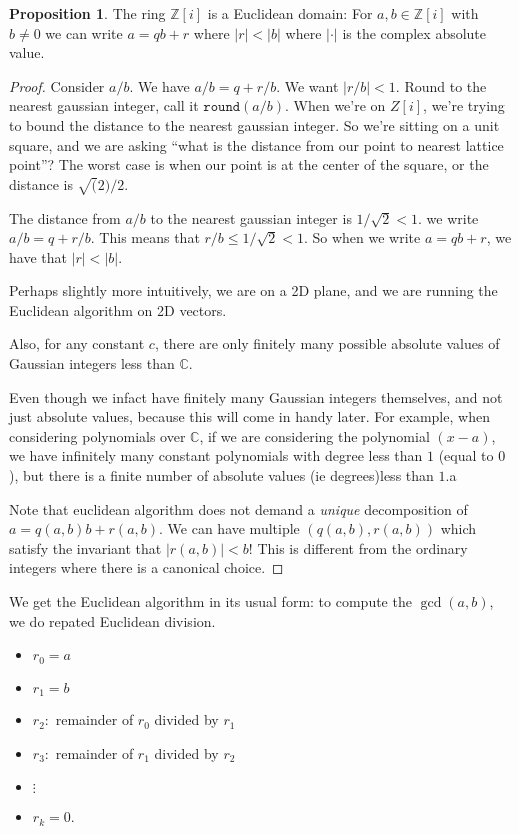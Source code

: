 \documentclass{book}
\theoremstyle{definition}
\newtheorem{proposition}[theorem]{Proposition}
\newcommand{\Z}{\mathbb Z}
\begin{document}
\begin{proposition}
The ring $\Z[i]$ is a Euclidean domain: For $a, b \in \Z[i]$ with $b \neq 0$ we can write
$a = qb + r$ where $|r| < |b|$ where $|\cdot|$ is the complex absolute value.
\end{proposition}
\begin{proof}
Consider $a/b$. We have $a/b = q + r/b$. We want $|r/b| < 1$. Round to the 
nearest gaussian integer, call it $\texttt{round}(a/b)$. When we're on $Z[i]$, 
we're trying to bound the distance to the nearest gaussian integer. So we're
sitting on a unit square, and we are asking  ``what is the distance from our
point to nearest lattice point''? The worst case is when our point is at the
center of the square, or the distance is $\sqrt(2)/2$. 

The distance from $a/b$ to the nearest gaussian integer is $1/\sqrt 2 < 1$.
we write $a/b = q + r/b$. This means that $r/b \leq 1/\sqrt 2< 1$.
So when we write $a = qb + r$,
we have that $|r| < |b|$.  

Perhaps slightly more intuitively, we are on a 2D plane, and we are running the
Euclidean algorithm on 2D vectors. 

Also, for any constant
$c$, there are only finitely many possible absolute values of Gaussian integers
less than $\mathbb C$.

Even though we infact have finitely many Gaussian integers
themselves, and not just absolute values, because this will come in handy later.
For example, when considering polynomials over $\mathbb C$, if we are considering the
polynomial $(x - a)$, we have infinitely many constant polynomials with degree
less than $1$ (equal to $0$), but there is a finite number of absolute values
(ie degrees)less than $1$.a


Note that euclidean algorithm does not demand a \emph{unique} decomposition of
$a = q(a, b) b + r(a, b)$. We can have multiple $(q(a, b), r(a, b))$ which
satisfy the invariant that $|r(a, b)| < b$! This is different from the ordinary
integers where there is a canonical choice.
\end{proof}

We get the Euclidean algorithm in its usual form: to compute the $\gcd(a, b)$, we do
repated Euclidean division.
\begin{itemize}
\item $r_0 = a$
\item $r_1 = b$
\item $r_2: $ remainder of $r_0$ divided by $r_1$
\item $r_3: $ remainder of $r_1$ divided by $r_2$
\item $\vdots$
\item $r_k = 0$.
\end{itemize}
\end{document}
